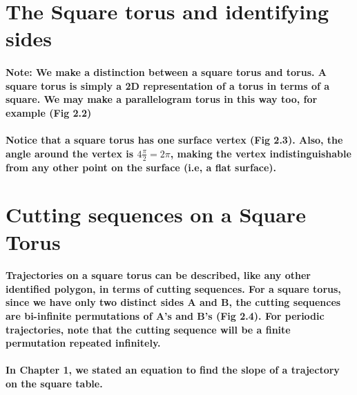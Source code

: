 \documentclass{report}
\begin{document}
\section{The Square torus and identifying sides}



\paragraph{Note: We make a distinction between a square torus and  torus. A square torus is simply a 2D representation of a torus in terms of a square. We may make a parallelogram torus in this way too, for example (Fig 2.2)
}


\paragraph{Notice that a square torus has one surface vertex (Fig 2.3). Also, the angle around the vertex is $4\frac{\pi}{2} = 2\pi$, making the vertex indistinguishable from any other point on the surface (i.e, a flat surface).}


\section{Cutting sequences on a Square Torus}

\paragraph{Trajectories on a square torus can be described, like any other identified polygon, in terms of cutting sequences. For a square torus, since we have only two distinct sides A and B, the cutting sequences are bi-infinite permutations of A’s and B’s (Fig 2.4). For periodic trajectories, note that the cutting sequence will be a finite permutation repeated infinitely.}


\paragraph{In Chapter 1, we stated an equation to find the slope of a trajectory on the square table.}
\end{document}

